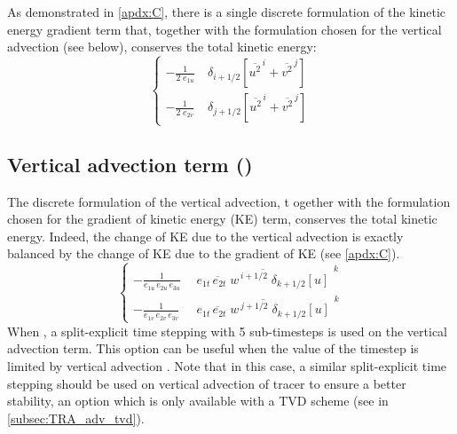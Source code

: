 \documentclass[../main/NEMO_manual]{subfiles}
\begin{document}
As demonstrated in \autoref{apdx:C},
there is a single discrete formulation of the kinetic energy gradient term that,
together with the formulation chosen for the vertical advection (see below),
conserves the total kinetic energy:
\[
  \left\{
    \begin{aligned}
      -\frac{1}{2 \; e_{1u} }  & \ \delta_{i+1/2} \left[ {\overline {u^2}^{\,i} + \overline{v^2}^{\,j}} \right]   \\
      -\frac{1}{2 \; e_{2v} }  & \ \delta_{j+1/2} \left[ {\overline {u^2}^{\,i} + \overline{v^2}^{\,j}} \right]
    \end{aligned}
  \right.
\]

\subsection{Vertical advection term (\protect{}) }
\label{subsec:DYN_zad}

The discrete formulation of the vertical advection, t
ogether with the formulation chosen for the gradient of kinetic energy (KE) term,
conserves the total kinetic energy.
Indeed, the change of KE due to the vertical advection is exactly balanced by
the change of KE due to the gradient of KE (see \autoref{apdx:C}).
\[
  \left\{
    \begin{aligned}
      -\frac{1} {e_{1u}\,e_{2u}\,e_{3u}} &\ \overline{\ \overline{ e_{1t}\,e_{2t}\;w } ^{\,i+1/2}  \;\delta_{k+1/2} \left[ u \right]\  }^{\,k}  \\
      -\frac{1} {e_{1v}\,e_{2v}\,e_{3v}}  &\ \overline{\ \overline{ e_{1t}\,e_{2t}\;w } ^{\,j+1/2}  \;\delta_{k+1/2} \left[ u \right]\  }^{\,k}
    \end{aligned}
  \right.
\]
When ,
a split-explicit time stepping with 5 sub-timesteps is used on the vertical advection term.
This option can be useful when the value of the timestep is limited by vertical advection \citep{Lemarie_OM2015}. 
Note that in this case,
a similar split-explicit time stepping should be used on vertical advection of tracer to ensure a better stability,
an option which is only available with a TVD scheme (see  in \autoref{subsec:TRA_adv_tvd}).
\end{document}
